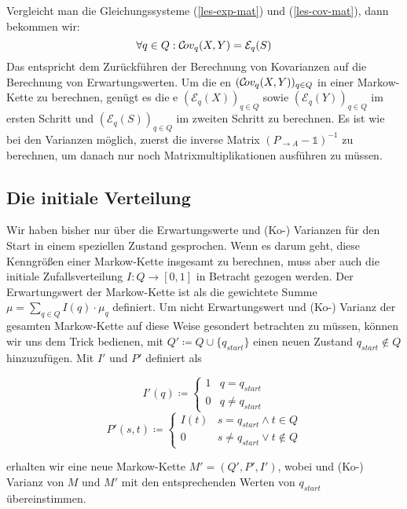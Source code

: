 \documentclass[a4paper]{article}
\newcommand{\mc}{Markow-Kette}
\theoremstyle{nonumberplain}
\begin{document}
 Vergleicht man die Gleichungssysteme (\ref{les-exp-mat}) und (\ref{les-cov-mat}), dann bekommen wir:
\begin{equation}
\forall q \in Q : \mathcal{C}\!ov_q(X,Y) = \mathcal{E}_q(S)
\end{equation}
Das entspricht dem Zurückführen der Berechnung von Kovarianzen auf die Berechnung von Erwartungswerten. Um die \cov{}en $(\mathcal{C}\!ov_q(X,Y))_{q\in Q}$ in einer \mc{} zu berechnen, genügt es die \expect{}e $(\mathcal{E}_q(X))_{q\in Q}$ sowie $(\mathcal{E}_q(Y))_{q\in Q}$ im ersten Schritt und $(\mathcal{E}_q(S))_{q\in Q}$ im zweiten Schritt zu berechnen. Es ist wie bei den Varianzen möglich, zuerst die inverse Matrix $(P_{\rightarrow A} - \mathbb{1})^{-1}$ zu berechnen, um danach nur noch Matrixmultiplikationen ausführen zu müssen.

\subsection{Die initiale Verteilung}

Wir haben bisher nur über die Erwartungswerte und (Ko-) Varianzen für den Start in einem speziellen Zustand gesprochen. Wenn es darum geht, diese Kenngrößen einer \mc{} \mcex{} insgesamt zu berechnen, muss aber auch die initiale Zufallsverteilung $I : Q \to [0,1]$ in Betracht gezogen werden. Der Erwartungswert der \mc{} ist als die gewichtete Summe $\mu = \sum_{q\in Q}{I(q) \cdot \mu_q}$ definiert. Um nicht Erwartungswert und (Ko-) Varianz der gesamten \mc{} auf diese Weise gesondert betrachten zu müssen, können wir uns dem Trick bedienen, mit $Q' \coloneqq Q \cup \{q_{start}\}$ einen neuen Zustand $q_{start} \notin Q$ hinzuzufügen. Mit $I'$ und $P'$ definiert als
\begin{multicols}{2}
\noindent
\begin{equation*}
	I'(q) \coloneqq \begin{cases}
		1 & q = q_{start}\\
		0 & q \neq q_{start}
		
	\end{cases}
\end{equation*}
\begin{equation*}
	P'(s, t)  \coloneqq \begin{cases}
	I(t) & s = q_{start} \land t \in Q \\
	0 & s \neq q_{start} \lor t \notin Q
	\end{cases}
\end{equation*}
\end{multicols}
erhalten wir eine neue \mc{} $M'=(Q',P',I')$, wobei \expect{} und (Ko-) Varianz von $M$ und $M'$ mit den entsprechenden Werten von $q_{start}$ übereinstimmen.
\end{document}

